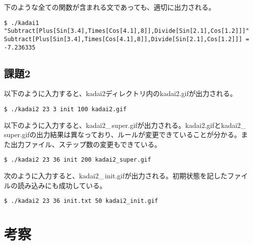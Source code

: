 \documentclass{jsarticle}
\begin{document}
下のような全ての関数が含まれる文であっても、適切に出力される。
\begin{verbatim}
$ ./kadai1 "Subtract[Plus[Sin[3.4],Times[Cos[4.1],8]],Divide[Sin[2.1],Cos[1.2]]]"
Subtract[Plus[Sin[3.4],Times[Cos[4.1],8]],Divide[Sin[2.1],Cos[1.2]]] = -7.236335
\end{verbatim}
\subsection{課題2}
以下のように入力すると、kadai2ディレクトリ内のkadai2.gifが出力される。
\begin{verbatim}
$ ./kadai2 23 3 init 100 kadai2.gif
\end{verbatim}
以下のように入力すると、kadai2\_\,super.gifが出力される。kadai2.gifとkadai2\_\,super.gifの出力結果は異なっており、ルールが変更できていることが分かる。また出力ファイル、ステップ数の変更もできている。
\begin{verbatim}
$ ./kadai2 23 36 init 200 kadai2_super.gif
\end{verbatim}
次のように入力すると、kadai2\_\,init.gifが出力される。初期状態を記したファイルの読み込みにも成功している。
\begin{verbatim}
$ ./kadai2 23 36 init.txt 50 kadai2_init.gif
\end{verbatim}

\section{考察}
\end{document}
